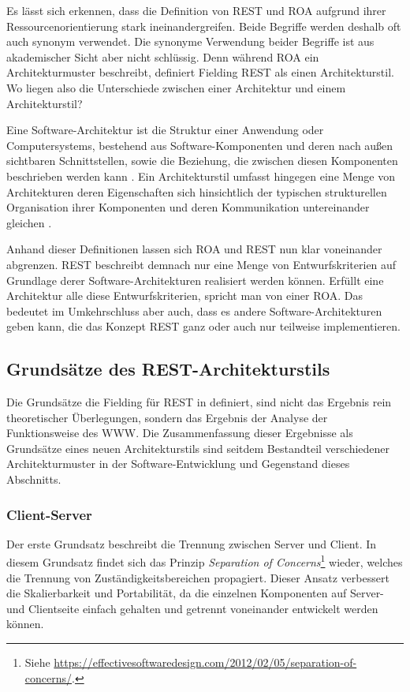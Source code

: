Es lässt sich erkennen, dass die Definition von \ac{REST} und \ac{ROA} aufgrund ihrer Ressourcenorientierung stark ineinandergreifen. Beide Begriffe werden deshalb oft auch synonym verwendet. Die synonyme Verwendung beider Begriffe ist aus akademischer Sicht aber nicht schlüssig. Denn während \ac{ROA} ein Architekturmuster beschreibt, definiert Fielding \ac{REST} als einen Architekturstil. Wo liegen also die Unterschiede zwischen einer Architektur und einem Architekturstil?

Eine Software-Architektur ist die Struktur einer Anwendung oder Computersystems, bestehend aus Software-Komponenten und deren nach außen sichtbaren Schnittstellen, sowie die Beziehung, die zwischen diesen Komponenten beschrieben werden kann \parencite[vgl.][21]{Bass2003}. Ein Architekturstil umfasst hingegen eine Menge von Architekturen deren Eigenschaften sich hinsichtlich der typischen strukturellen Organisation ihrer Komponenten und deren Kommunikation untereinander gleichen \parencite[vgl.][20]{Shaw1996}.

Anhand dieser Definitionen lassen sich \ac{ROA} und \ac{REST} nun klar voneinander abgrenzen. \ac{REST} beschreibt demnach nur eine Menge von Entwurfskriterien auf Grundlage derer Software-Architekturen realisiert werden können. Erfüllt eine Architektur alle diese Entwurfskriterien, spricht man von einer \ac{ROA}. Das bedeutet im Umkehrschluss aber auch, dass es andere Software-Architekturen geben kann, die das Konzept \ac{REST} ganz oder auch nur teilweise implementieren.

\subsection{Grundsätze des REST-Architekturstils}
\label{sec:ROA:Grundsätze des REST-Architekturstils}

Die Grundsätze die Fielding für \ac{REST} in  definiert, sind nicht das Ergebnis rein theoretischer Überlegungen, sondern das Ergebnis der Analyse der Funktionsweise des \ac{WWW}. Die Zusammenfassung dieser Ergebnisse als Grundsätze eines neuen Architekturstils sind seitdem Bestandteil verschiedener Architekturmuster in der Software-Entwicklung und Gegenstand dieses Abschnitts.

\subsubsection{Client-Server}

Der erste Grundsatz beschreibt die Trennung zwischen Server und Client. In diesem Grundsatz findet sich das Prinzip \emph{Separation of Concerns}\footnote{Siehe \hyperlink{https://effectivesoftwaredesign.com/2012/02/05/separation-of-concerns/}{https://effectivesoftwaredesign.com/2012/02/05/separation-of-concerns/}.} wieder, welches die Trennung von Zuständigkeitsbereichen propagiert. Dieser Ansatz verbessert die Skalierbarkeit und Portabilität, da die einzelnen Komponenten auf Server- und Clientseite einfach gehalten und getrennt voneinander entwickelt werden können.

